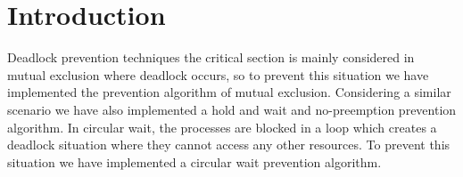 \documentclass[sigplan,screen]{acmart}
\begin{document}



\maketitle

\section{Introduction}
Deadlock prevention techniques the critical section is mainly considered in mutual exclusion where deadlock occurs, so to prevent this situation we have implemented the prevention algorithm of mutual exclusion. Considering a similar scenario we have also implemented a hold and wait and no-preemption prevention algorithm. In circular wait, the processes are blocked in a loop which creates a deadlock situation where they cannot access any other resources. To prevent this situation we have implemented a circular wait prevention algorithm. 
\end{document}
